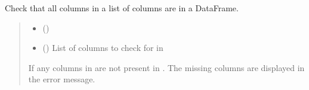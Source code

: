 \documentclass[letterpaper,10pt,english]{sphinxmanual}
\begin{document}

\begin{fulllineitems}
\label{\detokenize{misc:glomar_gridding.utils.check_cols}}
\pysigstartsignatures
\pysiglinewithargsret
{}
{\sphinxparamcomma {}}
{}
\pysigstopsignatures
\sphinxAtStartPar
Check that all columns in a list of columns are in a DataFrame.
\begin{quote}\begin{description}
\begin{itemize}
\item {}
\sphinxAtStartPar
{} ()

\item {}
\sphinxAtStartPar
{} (\sphinxstyleliteralemphasis{\sphinxupquote{{[}}}\sphinxstyleliteralemphasis{\sphinxupquote{{]}}}) \textendash{} List of columns to check for in 

\end{itemize}

\sphinxAtStartPar
{\hyperref[\detokenize{misc:glomar_gridding.utils.ColumnNotFoundError}]{}} \textendash{} If any columns in  are not present in . The missing columns
    are displayed in the error message.

\sphinxAtStartPar
{}

\end{description}\end{quote}

\end{fulllineitems}

\end{document}
